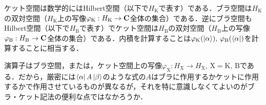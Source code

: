 \documentclass{jarticle}
\begin{document}
\begin{enumerate}
\begin{itemize}
    ケット空間は数学的にはHilbert空間（以下で$H_\mathrm{K}$で表す）である．ブラ空間は$H_\mathrm{K}$の双対空間（$H_\mathrm{K}$上の写像$\varphi_\mathrm{K}: H_\mathrm{K} \rightarrow \bf{C}$全体の集合）である．逆にブラ空間もHilbert空間（以下で$H_\mathrm{B}$で表す）でケット空間は$H_\mathrm{B}$の双対空間（$H_\mathrm{B}$上の写像$\varphi_{\mathrm{B}}: H_\mathrm{B} \rightarrow \bf{C}$全体の集合）である．内積を計算することは$\varphi_\mathrm{K}(\ket{\alpha}), \, \varphi_\mathrm{B}(\bra{\alpha})$を計算することに相当する．

    演算子はブラ空間，または，ケット空間上の写像$\varphi_\mathrm{X}: H_\mathrm{X} \rightarrow H_\mathrm{X}, \, \mathrm{X = K, \, B}$である．だから，厳密には$\bra{\alpha}A\ket{\beta}$のような式の$A$はブラに作用するかケットに作用するかで作用させているものが異なるが，それを特に意識しなくてよいのがブラ・ケット記法の便利な点ではなかろうか．
  \end{itemize}
\end{enumerate}
\noindent
\end{document}
